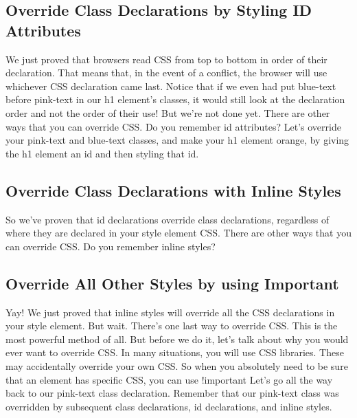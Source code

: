\documentclass{article}%
\begin{document}
\subsection{Override Class Declarations by Styling ID Attributes}%
\label{subsec:OverrideClassDeclarationsbyStylingIDAttributes}%
We just proved that browsers read CSS from top to bottom in order of their declaration. That means that, in the event of a conflict, the browser will use whichever CSS declaration came last. Notice that if we even had put blue{-}text before pink{-}text in our h1 element's classes, it would still look at the declaration order and not the order of their use!\newline%
But we're not done yet. There are other ways that you can override CSS. Do you remember id attributes?\newline%
Let's override your pink{-}text and blue{-}text classes, and make your h1 element orange, by giving the h1 element an id and then styling that id.\newline%

%
\subsection{Override Class Declarations with Inline Styles}%
\label{subsec:OverrideClassDeclarationswithInlineStyles}%
So we've proven that id declarations override class declarations, regardless of where they are declared in your style element CSS.\newline%
There are other ways that you can override CSS. Do you remember inline styles?\newline%

%
\subsection{Override All Other Styles by using Important}%
\label{subsec:OverrideAllOtherStylesbyusingImportant}%
Yay! We just proved that inline styles will override all the CSS declarations in your style element.\newline%
But wait. There's one last way to override CSS. This is the most powerful method of all. But before we do it, let's talk about why you would ever want to override CSS.\newline%
In many situations, you will use CSS libraries. These may accidentally override your own CSS. So when you absolutely need to be sure that an element has specific CSS, you can use !important\newline%
Let's go all the way back to our pink{-}text class declaration. Remember that our pink{-}text class was overridden by subsequent class declarations, id declarations, and inline styles.\newline%
\end{document}
